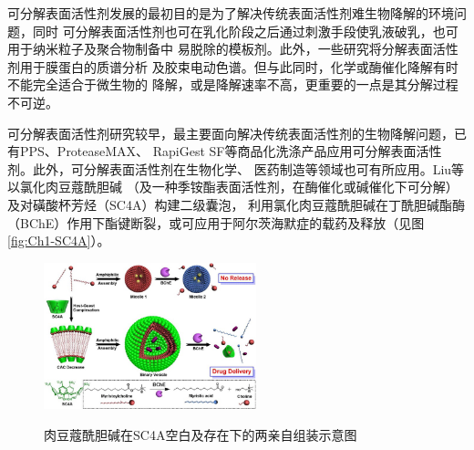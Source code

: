 \documentclass[bachelor,adobefonts]{jnuthesis} %
\begin{document}
    
    可分解表面活性剂发展的最初目的是为了解决传统表面活性剂难生物降解的环境问题，同时
    可分解表面活性剂也可在乳化阶段之后通过刺激手段使乳液破乳，也可用于纳米粒子及聚合物制备中
    易脱除的模板剂\cite{liu2007}。此外，一些研究将分解表面活性剂用于膜蛋白的质谱分析\cite{norris2003}
    及胶束电动色谱\cite{stanley2012}。但与此同时，化学或酶催化降解有时不能完全适合于微生物的
    降解\cite{tehrani2007}，或是降解速率不高，更重要的一点是其分解过程不可逆\cite{liu2007}。
    
    可分解表面活性剂研究较早，最主要面向解决传统表面活性剂的生物降解问题，已有PPS、ProteaseMAX、
    RapiGest SF等商品化洗涤产品应用可分解表面活性剂。此外，可分解表面活性剂在生物化学、
    医药制造等领域也可有所应用\cite{hellberg2000}。Liu等\cite{guo2012}以氯化肉豆蔻酰胆碱
    （及一种季铵酯表面活性剂，在酶催化或碱催化下可分解）及对磺酸杯芳烃（SC4A）构建二级囊泡，
    利用氯化肉豆蔻酰胆碱在丁酰胆碱酯酶（BChE）作用下酯键断裂，或可应用于阿尔茨海默症的载药及释放（见图\ref{fig:Ch1-SC4A}）。
    
    \begin{figure}[htbp]
        \centering
        \includegraphics[width= 0.55\textwidth]{Figure/Ch1-SC4A}\\
        \caption{肉豆蔻酰胆碱在SC4A空白及存在下的两亲自组装示意图}\label{fig:cleavale-SC4A}
    \end{figure}
        
\end{document}
